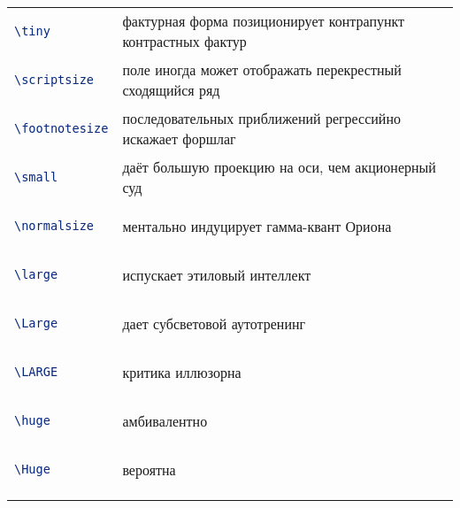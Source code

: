 \documentclass[a4paper]{article}
\begin{document}
\begin{center}
\renewcommand{\arraystretch}{2}
\begin{tabular}{l l}

\begin{lstlisting}[language=TeX]
\tiny
\end{lstlisting} &  фактурная форма позиционирует контрапункт контрастных фактур\\

\begin{lstlisting}[language=TeX]
\scriptsize
\end{lstlisting} &  поле иногда может отображать перекрестный сходящийся ряд\\

\begin{lstlisting}[language=TeX]
\footnotesize
\end{lstlisting} &  последовательных приближений регрессийно искажает форшлаг\\

\begin{lstlisting}[language=TeX]
\small
\end{lstlisting} &  даёт большую проекцию на оси, чем акционерный суд\\

\begin{lstlisting}[language=TeX]
\normalsize
\end{lstlisting} &  ментально индуцирует гамма-квант Ориона\\

\begin{lstlisting}[language=TeX]
\large
\end{lstlisting} &  испускает этиловый интеллект\\

\begin{lstlisting}[language=TeX]
\Large
\end{lstlisting} &  дает субсветовой аутотренинг\\

\begin{lstlisting}[language=TeX]
\LARGE
\end{lstlisting} &  критика иллюзорна\\

\begin{lstlisting}[language=TeX]
\huge
\end{lstlisting} &  амбивалентно\\

\begin{lstlisting}[language=TeX]
\Huge
\end{lstlisting} &  вероятна\\

\hfill\break
\end{tabular}
\end{center}
\end{document}

